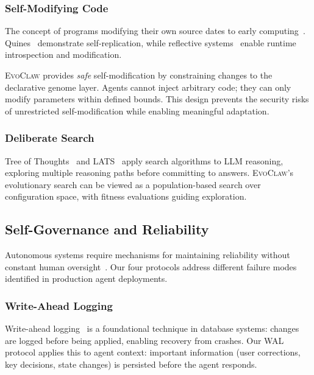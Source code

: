 \documentclass{article}
\newcommand{\evoclaw}{\textsc{EvoClaw}}
\begin{document}
\subsubsection{Self-Modifying Code}

The concept of programs modifying their own source dates to early computing~\cite{vonneumann1966self}. Quines~\cite{quine_thompson} demonstrate self-replication, while reflective systems~\cite{smith1984reflection} enable runtime introspection and modification.

\evoclaw{} provides \textit{safe} self-modification by constraining changes to the declarative genome layer. Agents cannot inject arbitrary code; they can only modify parameters within defined bounds. This design prevents the security risks of unrestricted self-modification while enabling meaningful adaptation.

\subsubsection{Deliberate Search}

Tree of Thoughts~\cite{yao2023tree} and LATS~\cite{zhou2023lats} apply search algorithms to LLM reasoning, exploring multiple reasoning paths before committing to answers. \evoclaw{}'s evolutionary search can be viewed as a population-based search over configuration space, with fitness evaluations guiding exploration.

\subsection{Self-Governance and Reliability}

Autonomous systems require mechanisms for maintaining reliability without constant human oversight~\cite{rushby1995critical}. Our four protocols address different failure modes identified in production agent deployments.

\subsubsection{Write-Ahead Logging}

Write-ahead logging~\cite{hewitt1976implementation} is a foundational technique in database systems: changes are logged before being applied, enabling recovery from crashes. Our WAL protocol applies this to agent context: important information (user corrections, key decisions, state changes) is persisted before the agent responds.
\end{document}
